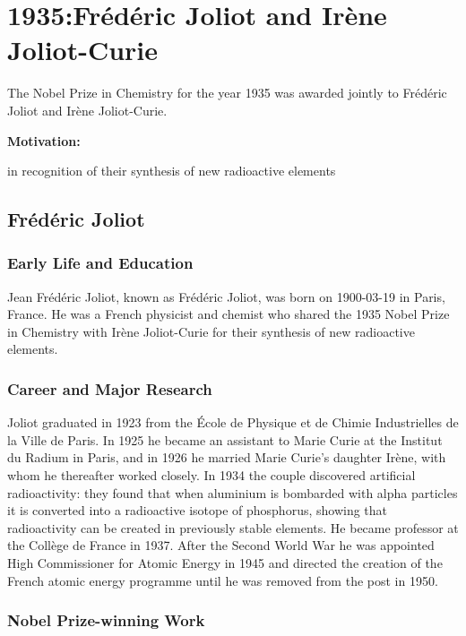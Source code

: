 \chapter{1935:Frédéric Joliot and Irène Joliot-Curie}

\label{chap:chemistry1935}

The Nobel Prize in Chemistry for the year 1935 was awarded jointly to Frédéric Joliot and Irène Joliot-Curie.

\textbf{Motivation:}

in recognition of their synthesis of new radioactive elements

\section{Frédéric Joliot}

\subsection*{Early Life and Education}

Jean Frédéric Joliot, known as Frédéric Joliot, was born on 1900-03-19 in Paris, France.
He was a French physicist and chemist who shared the 1935 Nobel Prize in Chemistry with Irène Joliot-Curie for their synthesis of new radioactive elements.

\subsection*{Career and Major Research}

Joliot graduated in 1923 from the École de Physique et de Chimie Industrielles de la Ville de Paris.
In 1925 he became an assistant to Marie Curie at the Institut du Radium in Paris, and in 1926 he married Marie Curie's daughter Irène, with whom he thereafter worked closely.
In 1934 the couple discovered artificial radioactivity: they found that when aluminium is bombarded with alpha particles it is converted into a radioactive isotope of phosphorus, showing that radioactivity can be created in previously stable elements.
He became professor at the Collège de France in 1937.
After the Second World War he was appointed High Commissioner for Atomic Energy in 1945 and directed the creation of the French atomic energy programme until he was removed from the post in 1950.

\subsection*{Nobel Prize-winning Work}

